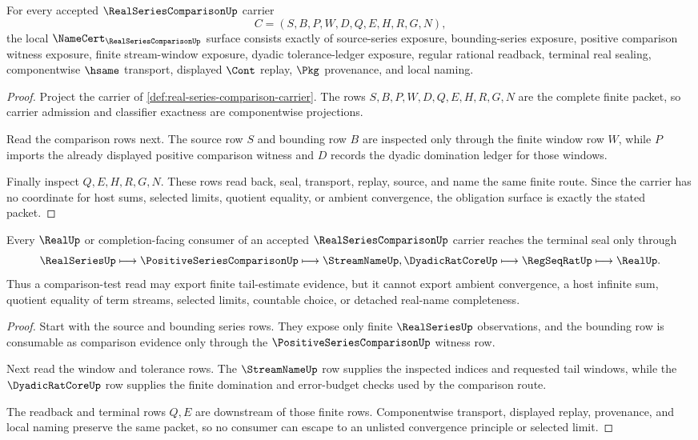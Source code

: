 \begin{theorem}
\label{thm:real-series-comparison-obligation-surface}
For every accepted $\RealSeriesComparisonUp$ carrier
$$
C=(S,B,P,W,D,Q,E,H,R,G,N),
$$
the local $\NameCert_{\RealSeriesComparisonUp}$ surface consists exactly of source-series exposure, bounding-series exposure, positive comparison witness exposure, finite stream-window exposure, dyadic tolerance-ledger exposure, regular rational readback, terminal real sealing, componentwise $\hsame$ transport, displayed $\Cont$ replay, $\Pkg$ provenance, and local naming.
\end{theorem}
\begin{proof}
Project the carrier of \autoref{def:real-series-comparison-carrier}. The rows $S,B,P,W,D,Q,E,H,R,G,N$ are the complete finite packet, so carrier admission and classifier exactness are componentwise projections.

Read the comparison rows next. The source row $S$ and bounding row $B$ are inspected only through the finite window row $W$, while $P$ imports the already displayed positive comparison witness and $D$ records the dyadic domination ledger for those windows.

Finally inspect $Q,E,H,R,G,N$. These rows read back, seal, transport, replay, source, and name the same finite route. Since the carrier has no coordinate for host sums, selected limits, quotient equality, or ambient convergence, the obligation surface is exactly the stated packet.
\end{proof}

\begin{theorem}
\label{thm:real-series-comparison-nonescape}
Every $\RealUp$ or completion-facing consumer of an accepted $\RealSeriesComparisonUp$ carrier reaches the terminal seal only through
$$
\RealSeriesUp \longmapsto \PositiveSeriesComparisonUp \longmapsto \StreamNameUp,\DyadicRatCoreUp \longmapsto \RegSeqRatUp \longmapsto \RealUp .
$$
Thus a comparison-test read may export finite tail-estimate evidence, but it cannot export ambient convergence, a host infinite sum, quotient equality of term streams, selected limits, countable choice, or detached real-name completeness.
\end{theorem}
\begin{proof}
Start with the source and bounding series rows. They expose only finite $\RealSeriesUp$ observations, and the bounding row is consumable as comparison evidence only through the $\PositiveSeriesComparisonUp$ witness row.

Next read the window and tolerance rows. The $\StreamNameUp$ row supplies the inspected indices and requested tail windows, while the $\DyadicRatCoreUp$ row supplies the finite domination and error-budget checks used by the comparison route.

The readback and terminal rows $Q,E$ are downstream of those finite rows. Componentwise transport, displayed replay, provenance, and local naming preserve the same packet, so no consumer can escape to an unlisted convergence principle or selected limit.
\end{proof}

